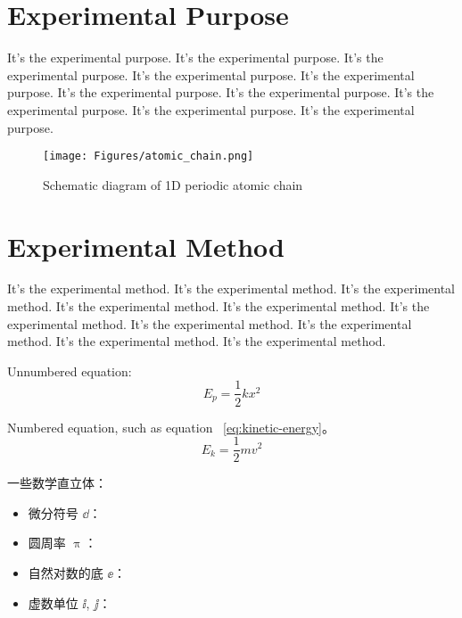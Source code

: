 
\setcounter{page}{1}


\titleformat{\section}{\raggedright\Large\bfseries}{\thesection}{1em}{}

\section{Experimental Purpose}

It's the experimental purpose. It's the experimental purpose. It's the experimental purpose. It's the experimental purpose. It's the experimental purpose.
It's the experimental purpose. It's the experimental purpose. It's the experimental purpose. It's the experimental purpose. It's the experimental purpose.


\begin{figure}[!htp]
    \centering
    \texttt{[image: Figures/atomic\_chain.png]}
    \caption{Schematic diagram of 1D periodic atomic chain}
    \label{fig:atomic-chain}
\end{figure}

\section{Experimental Method}\label{sec:exp-method}

It's the experimental method. It's the experimental method. It's the experimental method. It's the experimental method. It's the experimental method.
It's the experimental method. It's the experimental method. It's the experimental method. It's the experimental method. It's the experimental method.


Unnumbered equation:
\begin{equation*}
    E_p = \frac{1}{2} k x^2
\end{equation*}

Numbered equation, such as equation ~\ref{eq:kinetic-energy}。
\begin{equation}
    E_k = \frac{1}{2} m v^2
    \label{eq:kinetic-energy}
\end{equation}


一些数学直立体：
\begin{itemize}
  \item 微分符号 $\dd$：
  \item 圆周率 $\uppi$：
  \item 自然对数的底 $\ee$：
  \item 虚数单位 $\ii$, $\jj$： 
\end{itemize}


